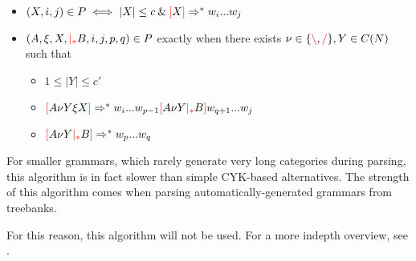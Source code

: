 \documentclass[main.tex]{subfiles}
\begin{document}
\begin{itemize}
    \item $(X, i, j) \in P \iff |X| \leq c \mathbin{\&} \textcolor{red}{[} X \textcolor{red}{]} \Rightarrow^* w_i ... w_j$
    \item $(A, \xi, X, \textcolor{red}{|_{*}} B, i, j, p, q) \in P$
        exactly when there exists $\nu \in \{ \textcolor{red}{\backslash}, \textcolor{red}{/} \}, Y \in C(N)$ such that
        \begin{itemize}
            \item $1 \leq |Y| \leq c'$
            \item $\textcolor{red}{[} A \nu Y \xi X \textcolor{red}{]} \Rightarrow^* w_i ... w_{p - 1} \textcolor{red}{[} A \nu Y \textcolor{red}{|_{*}} B \textcolor{red}{]} w_{q + 1} ... w_j$
            \item $\textcolor{red}{[} A \nu Y \textcolor{red}{|_{*}} B \textcolor{red}{]} \Rightarrow^* w_p ... w_q$
        \end{itemize}
\end{itemize}

For smaller grammars, which rarely generate very long categories during
parsing, this algorithm is in fact slower than simple CYK-based alternatives.
The strength of this algorithm comes when parsing automatically-generated
grammars from treebanks.

For this reason, this algorithm will not be used. For a more indepth
overview, see \cite{shanker}.
\end{document}
